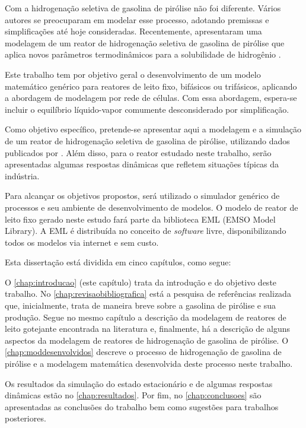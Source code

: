 Com a hidrogenação seletiva de gasolina de pirólise não
foi diferente. Vários autores se preocuparam em modelar esse
processo, adotando premissas e simplificações até hoje consideradas.
Recentemente,  apresentaram uma modelagem de
um reator de hidrogenação seletiva de gasolina de pirólise que aplica novos
parâmetros termodinâmicos para a solubilidade de hidrogênio \cite{Rojas2014}. 

Este trabalho tem por objetivo geral o desenvolvimento de um modelo
matemático genérico para reatores de leito fixo, bifásicos ou trifásicos,
aplicando a abordagem de modelagem por rede de células. Com essa
abordagem, espera-se incluir o equilíbrio líquido-vapor comumente
desconsiderado por simplificação. 

Como objetivo específico, pretende-se apresentar aqui a modelagem e a
simulação de um reator de hidrogenação seletiva de gasolina de pirólise,
utilizando dados publicados por . Além disso, para o
reator estudado neste trabalho, serão apresentadas algumas respostas dinâmicas
que refletem situações típicas da indústria.

Para alcançar os objetivos propostos, será utilizado o simulador genérico de
processos \emso{} \cite{Soares2003} e seu ambiente de desenvolvimento de
modelos. O modelo de reator de leito fixo gerado neste estudo fará parte da
biblioteca EML (EMSO Model Library). A EML é distribuída no conceito de
\emph{software} livre, disponibilizando todos os modelos via internet e sem custo.

Esta dissertação está dividida em cinco capítulos, como segue:

O \autoref{chap:introducao} (este capítulo) trata da introdução e do objetivo
deste trabalho. No \autoref{chap:revisaobibliografica} está a pesquisa
de referências realizada que, inicialmente, trata de maneira breve sobre a
gasolina de pirólise e sua produção. Segue no mesmo capítulo a descrição da
modelagem de reatores de leito gotejante encontrada na literatura e, finalmente,
há a descrição de alguns aspectos da modelagem de reatores de hidrogenação de
gasolina de pirólise. O \autoref{chap:moddesenvolvidos} descreve o processo de
hidrogenação de gasolina de pirólise e a modelagem matemática desenvolvida deste
processo neste trabalho.

Os resultados da simulação do estado estacionário e de algumas
respostas dinâmicas estão no \autoref{chap:resultados}. Por fim, no
\autoref{chap:conclusoes} são apresentadas as conclusões do trabalho bem como
sugestões para trabalhos posteriores.
